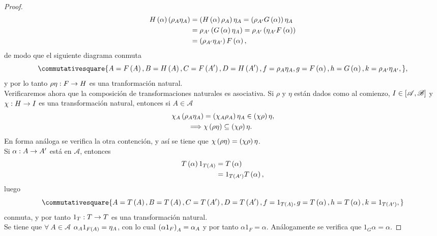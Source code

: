 \documentclass{article}
\begin{document}
\begin{enumerate}[label=\textbf{Ej \arabic*.}]
\begin{proof}
	 	\begin{align*}
	 		H\left(\alpha\right)\left(\rho_A\eta_A\right)&=\left(H\left(\alpha\right)\rho_{A}\right)\eta_{A}=\left(\rho_{A'}G\left(\alpha\right)\right)\eta_{A}\\&=\rho_{A'}\left(G\left(\alpha\right)\eta_{A}\right)=\rho_{A'}\left(\eta_{A'}F\left(\alpha\right)\right)\\&=\left(\rho_{A'}\eta_{A'}\right)F\left(\alpha\right),
	 	\end{align*}
 		de modo que el siguiente diagrama conmuta
 		\begin{equation*}
 			\commutativesquare{A=F\lrprth{A},B=H\lrprth{A},C=F\lrprth{A'},D=H\lrprth{A'},f=\rho_{A}\eta_{A},g=F\lrprth{\alpha},h=G\lrprth{\alpha},k=\rho_{A'}\eta_{A'},},
 		\end{equation*}
 		y por lo tanto $\catarrow{\rho\eta}{F}{H}{}$ es una tranformación natural.\\
 		Verificaremos ahora que la composición de transformaciones naturales es asociativa. Si $\rho$ y $\eta$ están dados como al comienzo, $I\in\left[\mathscr{A},\mathscr{B}\right]$ y $\catarrow{\chi}{H}{I}{}$  es una transformación natural, entonces si $A\in\mathscr{A}$
 		\begin{align*}
 			\chi_A\left(\rho_{A}\eta_{A}\right)&=\left(\chi_A\rho_{A}\right)\eta_{A}\in\left(\chi\rho\right)\eta,\\
 			\implies & \chi\left(\rho\eta\right)\subseteq\left(\chi\rho\right)\eta.
 		\end{align*}
 		En forma análoga se verifica la otra contención, y así se tiene que $\chi\left(\rho\eta\right)=\left(\chi\rho\right)\eta$.\\
 		 Si $\catarrow{\alpha}{A}{A'}{}$ está en $\mathscr{A}$, entonces
 		\begin{align*}
 			T\left(\alpha\right)1_{T\left(A\right)}&=T\left(\alpha\right)\\
 			&=1_{T\left(A'\right)}T\left(\alpha\right),
		\end{align*}
		luego\begin{equation*}
			\commutativesquare{A=T\lrprth{A},B=T\lrprth{A},C=T\lrprth{A'},D=T\lrprth{A'},f=1_{T\lrprth{A}},g=T\lrprth{\alpha},h=T\lrprth{\alpha},k=1_{T\lrprth{A'}},}
		\end{equation*}
		conmuta, y por tanto $\catarrow{1_T}{T}{T}{}$ es una transformación natural.\\
		 Se tiene que $\forall\ A\in\mathscr{A}$ $\alpha_A1_{F\left(A\right)}=\eta_A$, con lo cual $\left(\alpha 1_F\right)_A=\alpha_A$ y por tanto $\alpha 1_F=\alpha$. Análogamente se verifica que $1_G\alpha=\alpha$.
		\end{proof}

\end{enumerate}
\end{document}
